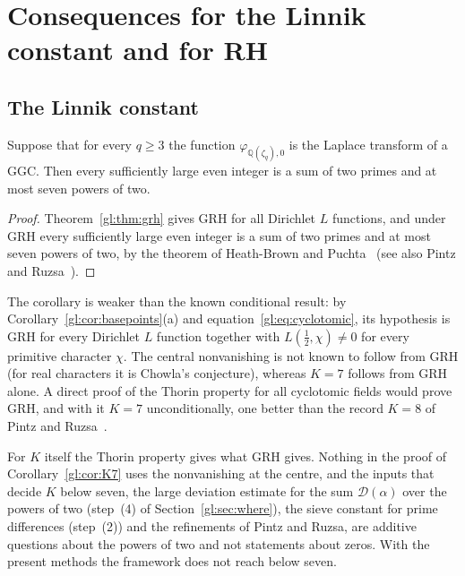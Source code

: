 \section{Consequences for the Linnik constant and for RH}\label{gl:sec:K}

\subsection{The Linnik constant}

\begin{corollary}\label{gl:cor:K7}
Suppose that for every $q\ge3$ the function $\varphi_{\mathbb Q(\zeta_q),0}$ is the Laplace transform of a GGC. Then every sufficiently large even integer is a sum of two primes and at most seven powers of two.
\end{corollary}

\begin{proof}
Theorem~\ref{gl:thm:grh} gives GRH for all Dirichlet $L$ functions, and under GRH every sufficiently large even integer is a sum of two primes and at most seven powers of two, by the theorem of Heath-Brown and Puchta~\cite{HBP02} (see also Pintz and Ruzsa~\cite{PR03}).
\end{proof}

The corollary is weaker than the known conditional result: by Corollary~\ref{gl:cor:basepoints}(a) and equation~\eqref{gl:eq:cyclotomic}, its hypothesis is GRH for every Dirichlet $L$ function together with $L(\tfrac12,\chi)\ne0$ for every primitive character $\chi$. The central nonvanishing is not known to follow from GRH (for real characters it is Chowla's conjecture), whereas $K=7$ follows from GRH alone. A direct proof of the Thorin property for all cyclotomic fields would prove GRH, and with it $K=7$ unconditionally, one better than the record $K=8$ of Pintz and Ruzsa~\cite{PR20}.

For $K$ itself the Thorin property gives what GRH gives. Nothing in the proof of Corollary~\ref{gl:cor:K7} uses the nonvanishing at the centre, and the inputs that decide $K$ below seven, the large deviation estimate for the sum $\mathcal D(\alpha)$ over the powers of two (step~(4) of Section~\ref{gl:sec:where}), the sieve constant for prime differences (step~(2)) and the refinements of Pintz and Ruzsa, are additive questions about the powers of two and not statements about zeros. With the present methods the framework does not reach below seven.

